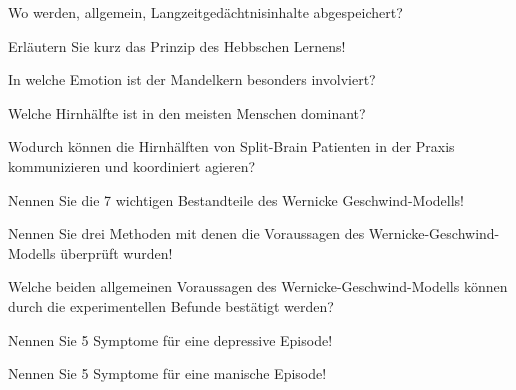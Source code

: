 \documentclass[10pt, a4paper]{exam}
\begin{document}
\begin{questions}
  \question Wo werden, allgemein, Langzeitgedächtnisinhalte abgespeichert?
  \begin{solution}

  \end{solution}

  \question Erläutern Sie kurz das Prinzip des Hebbschen Lernens!
  \begin{solution}

  \end{solution}

  \question In welche Emotion ist der Mandelkern besonders involviert?
  \begin{solution}

  \end{solution}

  \question Welche Hirnhälfte ist in den meisten Menschen dominant?
  \begin{solution}

  \end{solution}

  \question Wodurch können die Hirnhälften von Split-Brain Patienten in der Praxis kommunizieren und koordiniert agieren?
  \begin{solution}

  \end{solution}

  \question Nennen Sie die 7 wichtigen Bestandteile des Wernicke Geschwind-Modells!
  \begin{solution}

  \end{solution}

  \question Nennen Sie drei Methoden mit denen die Voraussagen des Wernicke-Geschwind-Modells überprüft wurden!
  \begin{solution}

  \end{solution}

  \question Welche beiden allgemeinen Voraussagen des Wernicke-Geschwind-Modells können durch die experimentellen Befunde bestätigt werden?
  \begin{solution}

  \end{solution}

  \question Nennen Sie 5 Symptome für eine depressive Episode!
  \begin{solution}

  \end{solution}

  \question Nennen Sie 5 Symptome für eine manische Episode!
  \begin{solution}


\end{solution}
\end{questions}
\end{document}
